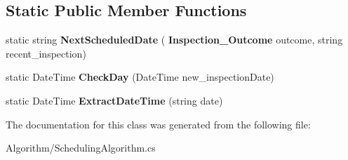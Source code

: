 \subsection*{Static Public Member Functions}
\begin{DoxyCompactItemize}
\item 
\mbox{\label{class_a_f_h___scheduler_1_1_algorithm_1_1_scheduling_algorithm_a2c98f9baf4e9e5aff8d36e0066ab6743}} 
static string {\bfseries Next\+Scheduled\+Date} (\textbf{ Inspection\+\_\+\+Outcome} outcome, string recent\+\_\+inspection)
\item 
\mbox{\label{class_a_f_h___scheduler_1_1_algorithm_1_1_scheduling_algorithm_a754f106dde63b9814b3d8148b5bf03ab}} 
static Date\+Time {\bfseries Check\+Day} (Date\+Time new\+\_\+inspection\+Date)
\item 
\mbox{\label{class_a_f_h___scheduler_1_1_algorithm_1_1_scheduling_algorithm_a376f1b31013d108590d666ba59c80911}} 
static Date\+Time {\bfseries Extract\+Date\+Time} (string date)
\end{DoxyCompactItemize}


The documentation for this class was generated from the following file\+:\begin{DoxyCompactItemize}
\item 
Algorithm/Scheduling\+Algorithm.\+cs\end{DoxyCompactItemize}
